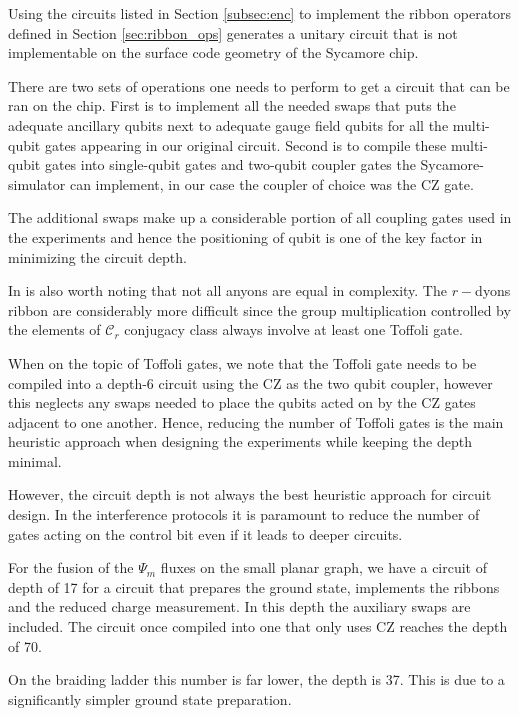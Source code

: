 \documentclass[two column]{article}
\begin{document}
Using the circuits listed in Section \ref{subsec:enc} to implement the ribbon operators defined in Section \ref{sec:ribbon_ops} generates a unitary circuit that is not implementable on the surface code geometry of the Sycamore chip.

There are two sets of operations one needs to perform to get a circuit that can be ran on the chip. First is to implement all the needed swaps that puts the adequate ancillary qubits next to adequate gauge field qubits for all the multi-qubit gates appearing in our original circuit. Second is to compile these multi-qubit gates into single-qubit gates and two-qubit coupler gates the Sycamore-simulator can implement, in our case the coupler of choice was the CZ gate. 

The additional swaps make up a considerable portion of all coupling gates used in the experiments and hence the positioning of qubit is one of the key factor in minimizing the circuit depth.

In is also worth noting that not all anyons are equal in complexity. The $r-$dyons ribbon are considerably more difficult since the group multiplication controlled by the elements of $\mathcal{C}_r$ conjugacy class always involve at least one Toffoli gate.

When on the topic of Toffoli gates, we note that the Toffoli gate needs to be compiled into a depth-6 circuit using the CZ as the two qubit coupler, however this neglects any swaps needed to place the qubits acted on by the CZ gates adjacent to one another. Hence, reducing the number of Toffoli gates is the main heuristic approach when designing the experiments while keeping the depth minimal.

However, the circuit depth is not always the best heuristic approach for circuit design. In the interference protocols it is paramount to reduce the number of gates acting on the control bit even if it leads to deeper circuits.

For the fusion of the $\Psi_m$ fluxes on the small planar graph, we have a circuit of depth of 17 for a circuit that prepares the ground state, implements the ribbons and the reduced charge measurement. In this depth the auxiliary swaps are included. The circuit once compiled into one that only uses CZ reaches the depth of 70.

On the braiding ladder this number is far lower, the depth is 37. This is due to a significantly simpler ground state preparation.
\end{document}
